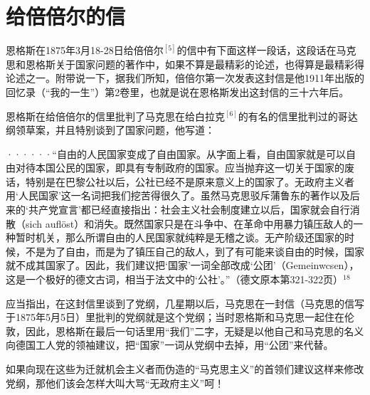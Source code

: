 \chapter{给倍倍尔的信} %

恩格斯在1875年3月18-28日给倍倍尔$^{[5]}$的信中有下面这样一段话，这段话在马克思和恩格斯关于国家问题的著作中，如果不算是最精彩的论述，也得算是最精彩得论述之一。附带说一下，据我们所知，倍倍尔第一次发表这封信是他1911年出版的回忆录（“我的一生”）第2卷里，也就是说在恩格斯发出这封信的三十六年后。

恩格斯在给倍倍尔的信里批判了马克思在给白拉克$^{[6]}$的有名的信里批判过的哥达纲领草案，并且特别谈到了国家问题，他写道：

\pskip
\leftskip=10mm
\small

······“自由的人民国家变成了自由国家。从字面上看，自由国家就是可以自由对待本国公民的国家，即具有专制政府的国家。应当抛弃这一切关于国家的废话，特别是在巴黎公社以后，公社已经不是原来意义上的国家了。无政府主义者用‘人民国家’这一名词把我们挖苦得很久了。虽然马克思驳斥蒲鲁东的著作以及后来的‘共产党宣言’都已经直接指出：社会主义社会制度建立以后，国家就会自行消散（sich aufl\"{o}st）和消失。既然国家只是在斗争中、在革命中用暴力镇压敌人的一种暂时机关，那么所谓自由的人民国家就纯粹是无稽之谈。无产阶级还国家的时候，不是为了自由，而是为了镇压自己的敌人，到了有可能来谈自由的时候，国家就不成其国家了。因此，我们建议把‘国家’一词全部改成‘公团’（Gemeinwcsen），这是一个极好的德文古词，相当于法文中的‘公社’。”（德文原本第321-322页）$^{18}$

\normalsize
\leftskip=0mm
\pskip

应当指出，在这封信里谈到了党纲，几星期以后，马克思在一封信（马克思的信写于1875年5月5日）里批判的党纲就是这个党纲；当时恩格斯和马克思一起住在伦敦，因此，恩格斯在最后一句话里用“我们”二字，无疑是以他自己和马克思的名义向德国工人党的领袖建议，把“国家”一词{\kaishu 从党纲中去掉}，用“公团”来代替。

如果向现在这些为迁就机会主义者而伪造的“马克思主义”的首领们建议这样来修改党纲，那他们该会怎样大叫大骂“无政府主义”呵！

